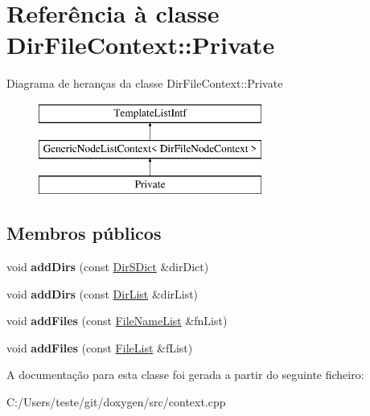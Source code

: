 \hypertarget{class_dir_file_context_1_1_private}{\section{Referência à classe Dir\-File\-Context\-:\-:Private}
\label{class_dir_file_context_1_1_private}
}
Diagrama de heranças da classe Dir\-File\-Context\-:\-:Private\begin{figure}[H]
\begin{center}
\leavevmode
\includegraphics[height=3.000000cm]{class_dir_file_context_1_1_private}
\end{center}
\end{figure}
\subsection*{Membros públicos}
\begin{DoxyCompactItemize}
\item 
\hypertarget{class_dir_file_context_1_1_private_adde048e931877b1c5378ba37751e7db4}{void {\bfseries add\-Dirs} (const \hyperlink{class_dir_s_dict}{Dir\-S\-Dict} \&dir\-Dict)}\label{class_dir_file_context_1_1_private_adde048e931877b1c5378ba37751e7db4}

\item 
\hypertarget{class_dir_file_context_1_1_private_afdcdfb3ec8355ffdce27ed0cb465e25b}{void {\bfseries add\-Dirs} (const \hyperlink{class_dir_list}{Dir\-List} \&dir\-List)}\label{class_dir_file_context_1_1_private_afdcdfb3ec8355ffdce27ed0cb465e25b}

\item 
\hypertarget{class_dir_file_context_1_1_private_abf0981fd8cef63889c656802c26c18fd}{void {\bfseries add\-Files} (const \hyperlink{class_file_name_list}{File\-Name\-List} \&fn\-List)}\label{class_dir_file_context_1_1_private_abf0981fd8cef63889c656802c26c18fd}

\item 
\hypertarget{class_dir_file_context_1_1_private_abdd68e02dfd0ea69e95a66769dc619c4}{void {\bfseries add\-Files} (const \hyperlink{class_file_list}{File\-List} \&f\-List)}\label{class_dir_file_context_1_1_private_abdd68e02dfd0ea69e95a66769dc619c4}

\end{DoxyCompactItemize}


A documentação para esta classe foi gerada a partir do seguinte ficheiro\-:\begin{DoxyCompactItemize}
\item 
C\-:/\-Users/teste/git/doxygen/src/context.\-cpp\end{DoxyCompactItemize}
